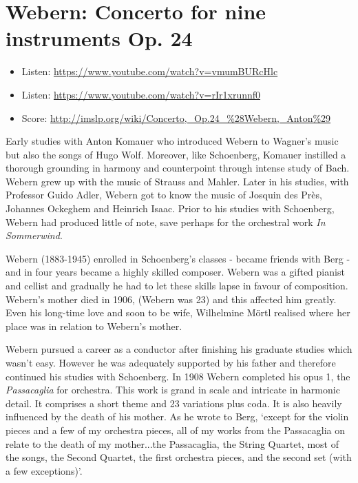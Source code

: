 \section{Webern: Concerto for nine instruments Op. 24}

\begin{itemize}
\item Listen: \url{https://www.youtube.com/watch?v=vmumBURcHlc}
\item Listen: \url{https://www.youtube.com/watch?v=rIr1xrunnf0}
\item Score: \url{http://imslp.org/wiki/Concerto,_Op.24_%28Webern,_Anton%29}
\end{itemize}

Early studies with Anton Komauer who introduced Webern to Wagner's music but also the songs of Hugo Wolf. Moreover, like Schoenberg, Komauer instilled a thorough grounding in harmony and counterpoint through intense study of Bach. Webern grew up with the music of Strauss and Mahler. Later in his studies, with Professor Guido Adler, Webern got to know the music of Josquin des Pr\`es, Johannes Ockeghem and Heinrich Isaac. Prior to his studies with Schoenberg, Webern had produced little of note, save perhaps for the orchestral work \textit{In Sommerwind}. 

Webern (1883-1945) enrolled in Schoenberg's classes - became friends with Berg - and in four years became a highly skilled composer. Webern was a gifted pianist and cellist and gradually he had to let these skills lapse in favour of composition. Webern's mother died in 1906, (Webern was 23) and this affected him greatly. Even his long-time love and soon to be wife, Wilhelmine M\"ortl realised where her place was in relation to Webern's mother. 

Webern pursued a career as a conductor after finishing his graduate studies which wasn't easy. However he was adequately supported by his father and therefore continued his studies with Schoenberg. In 1908 Webern completed his opus 1, the \textit{Passacaglia} for orchestra. This work is grand in scale and intricate in harmonic detail. It comprises a short theme and 23 variations plus coda. It is also heavily influenced by the death of his mother. As he wrote to Berg, `except for the violin pieces and a few of my orchestra pieces, all of my works from the Passacaglia on relate to the death of my mother...the Passacaglia, the String Quartet, most of the songs, the Second Quartet, the first orchestra pieces, and the second set (with a few exceptions)'. 

